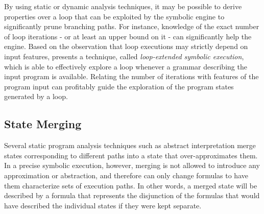 By using static or dynamic analysis techniques, it may be possible to derive properties over a loop that can be exploited by the symbolic engine to significantly prune branching paths. For instance, knowledge of the exact number of loop iterations - or at least an upper bound on it - can significantly help the engine.  Based on the observation  that loop executions may strictly depend on input features, \cite{SPM-ISSTA09} presents a technique, called {\em loop-extended symbolic execution}, which is able to effectively explore a loop whenever a grammar describing the input program is available. Relating the number of iterations with features of the program input can profitably guide the exploration of the program states generated by a loop.



\subsection{State Merging}

Several static program analysis techniques such as abstract interpretation merge states corresponding to different paths into a state that over-approximates them. In a precise symbolic execution, however, merging is not allowed to introduce any approximation or abstraction, and therefore can only change formulas to have them characterize sets of execution paths. In other words, a merged state will be described by a formula that represents the disjunction of the formulas that would have described the individual states if they were kept separate.

